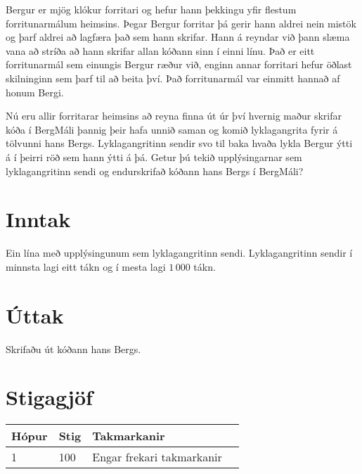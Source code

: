 Bergur er mjög klókur forritari og hefur hann þekkingu yfir flestum forritunarmálum heimsins. Þegar Bergur forritar þá gerir hann
aldrei nein mistök og þarf aldrei að lagfæra það sem hann skrifar. Hann á reyndar við þann slæma vana að stríða að hann skrifar
allan kóðann sinn í einni línu. Það er eitt forritunarmál sem einungis Bergur ræður við, enginn
annar forritari hefur öðlast skilninginn sem þarf til að beita því. Það forritunarmál var einmitt hannað af honum Bergi.

Nú eru allir forritarar heimsins að reyna finna út úr því hvernig maður skrifar kóða í BergMáli þannig þeir hafa unnið saman
og komið lyklagangrita fyrir á tölvunni hans Bergs. Lyklagangritinn sendir svo til baka hvaða lykla Bergur ýtti á í þeirri röð sem hann ýtti á þá.
Getur þú tekið upplýsingarnar sem lyklagangritinn sendi og endurskrifað kóðann hans Bergs í BergMáli?

\section*{Inntak}
Ein lína með upplýsingunum sem lyklagangritinn sendi. Lyklagangritinn sendir í minnsta lagi eitt tákn og í mesta lagi $1\,000$ tákn.

\section*{Úttak}
Skrifaðu út kóðann hans Bergs.

\section*{Stigagjöf}
\begin{tabular}{|l|l|l|l|}
\hline
Hópur & Stig & Takmarkanir \\ \hline
1     & 100  & Engar frekari takmarkanir \\ \hline
\end{tabular}

